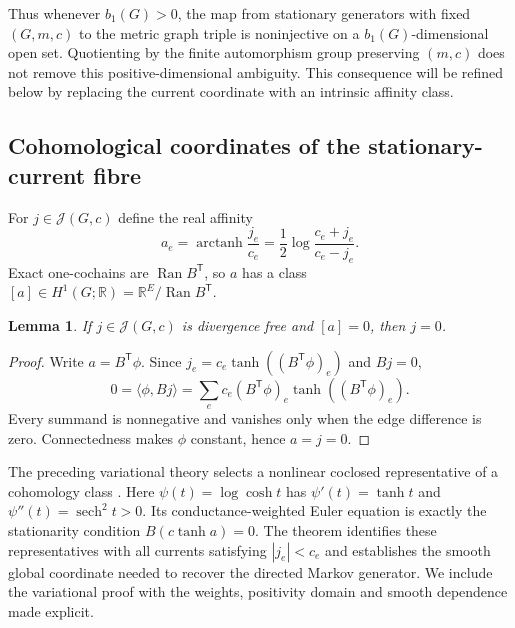 \documentclass[11pt]{article}
\newtheorem{lemma}[lemma]{Lemma}
\theoremstyle{definition}
\theoremstyle{remark}
\theoremstyle{definition}
\theoremstyle{remark}
\newcommand{\R}{\mathbb R}
\newcommand{\Ran}{\operatorname{Ran}}
\begin{document}
Thus whenever $b_1(G)>0$, the map from stationary generators
with fixed $(G,m,c)$ to the metric graph triple is noninjective on a
$b_1(G)$-dimensional open set.  Quotienting by the finite automorphism group
preserving $(m,c)$ does not remove this positive-dimensional ambiguity.  This
consequence will be refined below by replacing the current coordinate with an
intrinsic affinity class.

\subsection{Cohomological coordinates of the stationary-current fibre}

For $j\in\mathcal J(G,c)$ define the real affinity
\begin{equation}
 a_e=\operatorname{arctanh}\frac{j_e}{c_e}
 =\frac12\log\frac{c_e+j_e}{c_e-j_e}.
 \label{eq:supp-affinity}
\end{equation}
Exact one-cochains are $\Ran B^{\mathsf T}$, so $a$ has a class
$[a]\in H^1(G;\R)=\R^E/\Ran B^{\mathsf T}$.

\begin{lemma}
\label{lem:supp-zero-affinity}
If $j\in\mathcal J(G,c)$ is divergence free and $[a]=0$, then $j=0$.
\end{lemma}

\begin{proof}
Write $a=B^{\mathsf T}\phi$.  Since
$j_e=c_e\tanh((B^{\mathsf T}\phi)_e)$ and $Bj=0$,
\[
 0=\langle\phi,Bj\rangle
 =\sum_ec_e(B^{\mathsf T}\phi)_e
       \tanh((B^{\mathsf T}\phi)_e).
\]
Every summand is nonnegative and vanishes only when the edge difference is
zero.  Connectedness makes $\phi$ constant, hence $a=j=0$.
\end{proof}

The preceding variational theory selects a nonlinear coclosed representative
of a cohomology class \cite[Proposition~V.7]{PardoGuerraThapaWashburn2026}.
Here $\psi(t)=\log\cosh t$ has $\psi'(t)=\tanh t$ and
$\psi''(t)=\operatorname{sech}^2t>0$.  Its conductance-weighted Euler
equation is exactly the stationarity condition $B(c\tanh a)=0$.
The theorem identifies these representatives with all currents satisfying
$|j_e|<c_e$ and establishes the smooth global coordinate needed to recover
the directed Markov generator.  We include the variational proof with the
weights, positivity domain and smooth dependence made explicit.
\end{document}
